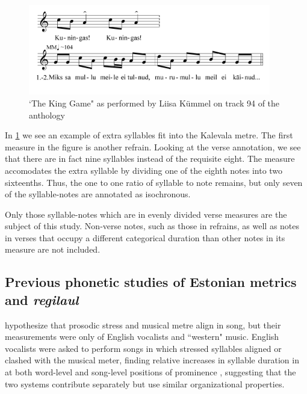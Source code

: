 \begin{figure}[htb]
\begin{center}
\includegraphics[width=300pt]{figures/094.png}
\caption{`The King Game" as performed by Liisa Kümmel on track 94 of the anthology}
\label{kinggame}
\end{center}
\end{figure}

In \ref{kinggame} we see an example of extra syllables fit into the Kalevala metre. The first measure in the figure is another refrain. Looking at the verse annotation, we see that there are in fact nine syllables instead of the requisite eight. The measure accomodates the extra syllable by dividing one of the eighth notes into two sixteenths. Thus, the one to one ratio of syllable to note remains, but only seven of the syllable-notes are annotated as isochronous. 

Only those syllable-notes which are in evenly divided verse measures are the subject of this study. Non-verse notes, such as those in refrains, as well as notes in verses that occupy a different categorical duration than other notes in its measure are not included. 

%
%
%
%
% 
% 

%
\subsection{Previous phonetic studies of Estonian metrics and {\it regilaul}}

 \citep{palmerLinguisticProsodyMusical1992} hypothesize that prosodic stress and musical metre align in song, but their measurements were only of English vocalists and ``western" music. 
English vocalists were asked to perform songs in which stressed syllables aligned or clashed with the musical meter, finding relative increases in syllable duration in at both word-level and song-level positions of prominence \citep{palmerLinguisticProsodyMusical1992}, suggesting that the two systems contribute separately but use similar organizational properties.

